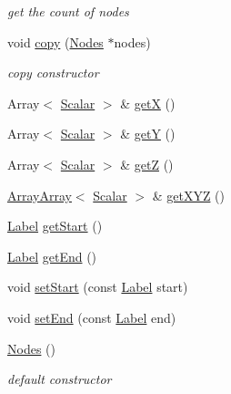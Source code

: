\begin{DoxyCompactItemize}
\begin{DoxyCompactList}\small\item\em get the count of nodes \item\end{DoxyCompactList}\item 
void \hyperlink{classHSF_1_1Nodes_a77f909942d5128a6cf8bb7fe6348a26d}{copy} (\hyperlink{classHSF_1_1Nodes}{Nodes} $\ast$nodes)
\begin{DoxyCompactList}\small\item\em copy constructor \item\end{DoxyCompactList}\item 
Array$<$ \hyperlink{namespaceHSF_a7419497552ed1c5631a818b75eed1aec}{Scalar} $>$ \& \hyperlink{classHSF_1_1Nodes_a4182f41b3eac0fe1654a9e857fb2ea76}{getX} ()
\item 
Array$<$ \hyperlink{namespaceHSF_a7419497552ed1c5631a818b75eed1aec}{Scalar} $>$ \& \hyperlink{classHSF_1_1Nodes_aec349ea7122ee1da0a60185e804adf1f}{getY} ()
\item 
Array$<$ \hyperlink{namespaceHSF_a7419497552ed1c5631a818b75eed1aec}{Scalar} $>$ \& \hyperlink{classHSF_1_1Nodes_a09fe0de278bdddea1c21634e7ade9fed}{getZ} ()
\item 
\hyperlink{classHSF_1_1ArrayArray}{ArrayArray}$<$ \hyperlink{namespaceHSF_a7419497552ed1c5631a818b75eed1aec}{Scalar} $>$ \& \hyperlink{classHSF_1_1Nodes_a760ecb9be7c2a92d622bfce425201784}{getXYZ} ()
\item 
\hyperlink{namespaceHSF_ae65d72be782e989396ebe5ec6ae4c2b6}{Label} \hyperlink{classHSF_1_1Nodes_ac040e3ba37f121943eb2d90c785addce}{getStart} ()
\item 
\hyperlink{namespaceHSF_ae65d72be782e989396ebe5ec6ae4c2b6}{Label} \hyperlink{classHSF_1_1Nodes_aa61b5c705ee968a95ba9036e55574ca1}{getEnd} ()
\item 
void \hyperlink{classHSF_1_1Nodes_ab8ee8ad861d256901605c11552e003d4}{setStart} (const \hyperlink{namespaceHSF_ae65d72be782e989396ebe5ec6ae4c2b6}{Label} start)
\item 
void \hyperlink{classHSF_1_1Nodes_a7dd80e94f1eae9c903ad4b2797dc0375}{setEnd} (const \hyperlink{namespaceHSF_ae65d72be782e989396ebe5ec6ae4c2b6}{Label} end)
\item 
\hyperlink{classHSF_1_1Nodes_a4cf0a36ef0cbd1d2183e6f426289b3ef}{Nodes} ()
\begin{DoxyCompactList}\small\item\em default constructor \item\end{DoxyCompactList}\item 

\end{DoxyCompactItemize}
